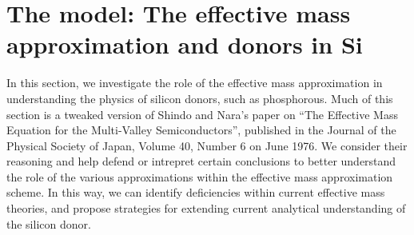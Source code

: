 \documentclass[aps, prl, preprint]{revtex4-2}
\begin{document}
\section{The model: The effective mass approximation and donors in Si}
In this section, we investigate the role of the effective mass
approximation in understanding the physics of silicon donors, such as
phosphorous. Much of this section is a tweaked version of Shindo and
Nara's paper on ``The Effective Mass Equation for the Multi-Valley
Semiconductors'', published in the Journal of the Physical Society of
Japan, Volume 40, Number 6 on June 1976. We consider their reasoning
and help defend or intrepret certain conclusions to better understand
the role of the various approximations within the effective mass
approximation scheme. In this way, we can identify deficiencies within
current effective mass theories, and propose strategies for extending
current analytical understanding of the silicon donor.






\end{document}
